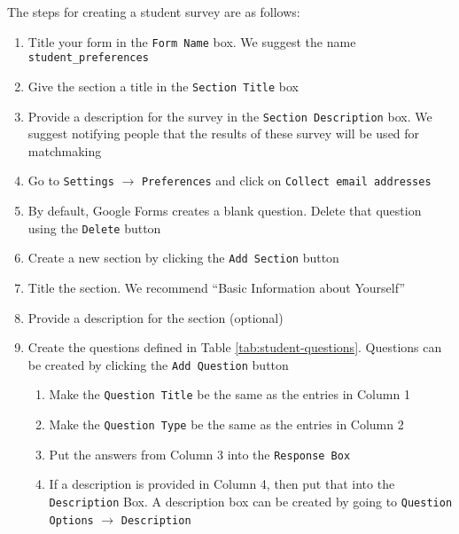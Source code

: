 The steps for creating a student survey are as follows:
\begin{enumerate}

	\item Title your form in the \texttt{Form Name} box. We suggest the name \texttt{student\_preferences}
	\item Give the section a title in the \texttt{Section Title} box
	\item Provide a description for the survey in the \texttt{Section Description} box.
			We suggest notifying people that the results of these survey will be used for matchmaking
	\item Go to \texttt{Settings} $\rightarrow$ \texttt{Preferences} and click on \texttt{Collect email addresses}
	\item By default, Google Forms creates a blank question.  Delete that question using the \texttt{Delete} button
	
	\item Create a new section by clicking the \texttt{Add Section} button
	\item Title the section.  We recommend ``Basic Information about Yourself''
	\item Provide a description for the section (optional)
	\item Create the questions defined in Table \ref{tab:student-questions}.  Questions can be created by clicking the \texttt{Add Question} button
		\begin{enumerate}
			\item Make the \texttt{Question Title} be the same as the entries in Column 1
			\item Make the \texttt{Question Type} be the same as the entries in Column 2
			\item Put the answers from Column 3 into the \texttt{Response Box}
			\item If a description is provided in Column 4, then put that into the \texttt{Description} Box. A description box can be created by going to \texttt{Question Options} $\rightarrow$ \texttt{Description}			
		\end{enumerate}
		
	\begin{table}[h!]
		\centering
		\begin{tabular}{| l | l | l | p{2in} |}
		

\end{tabular}
\end{table}
\end{enumerate}
